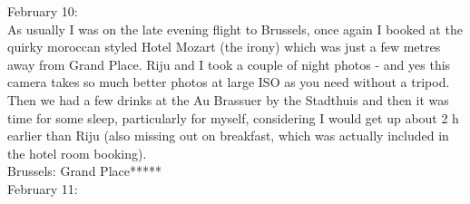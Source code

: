 February 10:\\
As usually I was on the late evening flight to Brussels, once again I booked at the quirky moroccan styled Hotel Mozart (the irony) which was just a few metres away from Grand Place. Riju and I took a couple of night photos - and yes this camera takes so much better photos at large ISO as you need without a tripod. Then we had a few drinks at the Au Brassuer by the Stadthuis and then it was time for some sleep, particularly for myself, considering I would get up about 2 h earlier than Riju (also missing out on breakfast, which was actually included in the hotel room booking).\\

Brussels: Grand Place*****\\

February 11:\\
